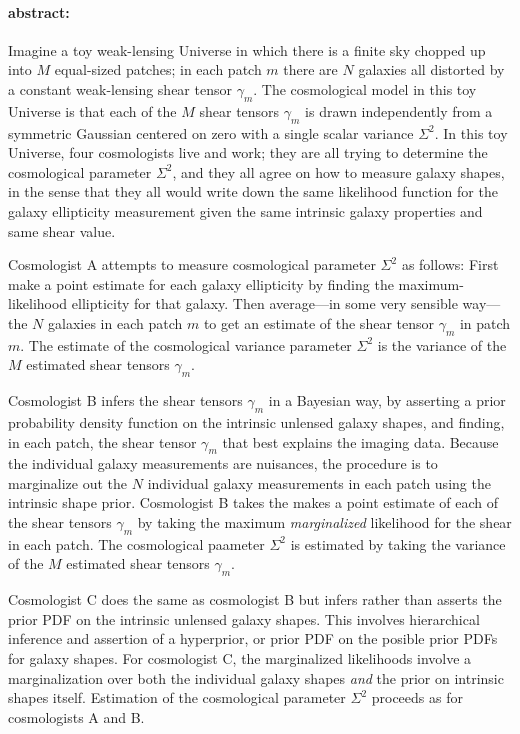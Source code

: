 \documentclass[12pt]{article}
\begin{document}
\paragraph{abstract:}
Imagine a toy weak-lensing Universe in which there is a finite sky
chopped up into $M$ equal-sized patches; in each patch $m$ there are
$N$ galaxies all distorted by a constant weak-lensing shear tensor
$\gamma_m$.  The cosmological model in this toy Universe is that each
of the $M$ shear tensors $\gamma_m$ is drawn independently from a
symmetric Gaussian centered on zero with a single scalar variance
$\Sigma^2$.  In this toy Universe, four cosmologists live and work;
they are all trying to determine the cosmological parameter
$\Sigma^2$, and they all agree on how to measure galaxy shapes, in the
sense that they all would write down the same likelihood function for
the galaxy ellipticity measurement given the same intrinsic galaxy
properties and same shear value.

Cosmologist A attempts to measure cosmological parameter $\Sigma^2$ as
follows: First make a point estimate for each galaxy ellipticity by
finding the maximum-likelihood ellipticity for that galaxy. Then
average---in some very sensible way---the $N$ galaxies in each patch
$m$ to get an estimate of the shear tensor $\gamma_m$ in patch $m$.
The estimate of the cosmological variance parameter $\Sigma^2$ is the
variance of the $M$ estimated shear tensors $\gamma_m$.

Cosmologist B infers the shear tensors $\gamma_m$ in a Bayesian way,
by asserting a prior probability density function on the intrinsic
unlensed galaxy shapes, and finding, in each patch, the shear tensor
$\gamma_m$ that best explains the imaging data.  Because the
individual galaxy measurements are nuisances, the procedure is to
marginalize out the $N$ individual galaxy measurements in each patch
using the intrinsic shape prior.  Cosmologist B takes the makes a
point estimate of each of the shear tensors $\gamma_m$ by taking the
maximum \emph{marginalized} likelihood for the shear in each patch.
The cosmological paameter $\Sigma^2$ is estimated by taking the
variance of the $M$ estimated shear tensors $\gamma_m$.

Cosmologist C does the same as cosmologist B but infers rather than
asserts the prior PDF on the intrinsic unlensed galaxy shapes.  This
involves hierarchical inference and assertion of a hyperprior, or
prior PDF on the posible prior PDFs for galaxy shapes.  For
cosmologist C, the marginalized likelihoods involve a marginalization
over both the individual galaxy shapes \emph{and} the prior on
intrinsic shapes itself.  Estimation of the cosmological parameter
$\Sigma^2$ proceeds as for cosmologists A and B.
\end{document}
